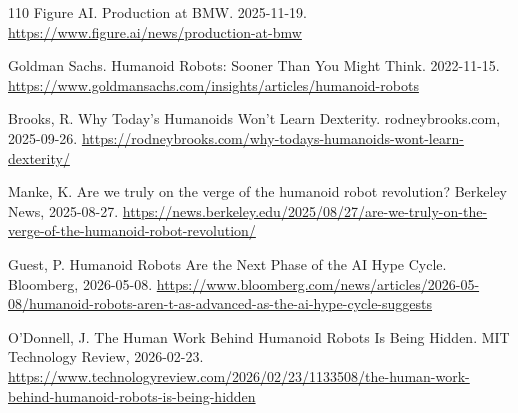 \documentclass[10pt]{article}
\begin{document}
\begin{thebibliography}{110}
Figure AI. Production at BMW. 2025-11-19. \url{https://www.figure.ai/news/production-at-bmw}

Goldman Sachs. Humanoid Robots: Sooner Than You Might Think. 2022-11-15. \url{https://www.goldmansachs.com/insights/articles/humanoid-robots}

Brooks, R. Why Today's Humanoids Won't Learn Dexterity. rodneybrooks.com, 2025-09-26. \url{https://rodneybrooks.com/why-todays-humanoids-wont-learn-dexterity/}

Manke, K. Are we truly on the verge of the humanoid robot revolution? Berkeley News, 2025-08-27. \url{https://news.berkeley.edu/2025/08/27/are-we-truly-on-the-verge-of-the-humanoid-robot-revolution/}

Guest, P. Humanoid Robots Are the Next Phase of the AI Hype Cycle. Bloomberg, 2026-05-08. \url{https://www.bloomberg.com/news/articles/2026-05-08/humanoid-robots-aren-t-as-advanced-as-the-ai-hype-cycle-suggests}

O'Donnell, J. The Human Work Behind Humanoid Robots Is Being Hidden. MIT Technology Review, 2026-02-23. \url{https://www.technologyreview.com/2026/02/23/1133508/the-human-work-behind-humanoid-robots-is-being-hidden}

\end{thebibliography}
\end{document}
